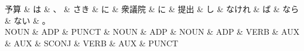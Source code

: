 \documentclass[tikz,border=5pt]{standalone}
\begin{document}
\normalsize
\begin{dependency}[edge unit distance=12.0pt]
    \begin{deptext}[column sep=1em]
        予算 \& は \& 、 \& さき \& に \& 衆議院 \& に \& 提出 \& し \& なけれ \& ば \& なら \& ない \& 。\\
        NOUN \& ADP \& PUNCT \& NOUN \& ADP \& NOUN \& ADP \& VERB \& AUX \& AUX \& SCONJ \& VERB \& AUX \& PUNCT\\
    \end{deptext}
\end{dependency}
\end{document}
